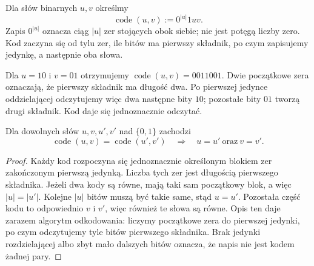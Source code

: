 \begin{definicja}
Dla słów binarnych $u,v$ określmy
\[
\operatorname{code}(u,v):=0^{|u|}1uv.
\]
Zapis $0^{|u|}$ oznacza ciąg $|u|$ zer stojących obok siebie;
nie jest potęgą liczby zero. Kod zaczyna się od tylu zer,
ile bitów ma pierwszy składnik, po czym zapisujemy jedynkę,
a następnie oba słowa.
\end{definicja}

\begin{przyklad}
Dla $u=10$ i $v=01$ otrzymujemy
$\operatorname{code}(u,v)=0011001$.
Dwie początkowe zera oznaczają, że pierwszy składnik
ma długość dwa. Po pierwszej jedynce oddzielającej
odczytujemy więc dwa następne bity $10$; pozostałe bity $01$
tworzą drugi składnik. Kod daje się jednoznacznie odczytać.
\end{przyklad}

\begin{lemat}\label{lem:computability-pair-code}
Dla dowolnych słów $u,v,u',v'$ nad $\{0,1\}$ zachodzi
\[
\operatorname{code}(u,v)=\operatorname{code}(u',v')
\quad\Longrightarrow\quad u=u'\ \text{oraz}\ v=v'.
\]
\end{lemat}
\begin{proof}
Każdy kod rozpoczyna się jednoznacznie określonym
blokiem zer zakończonym pierwszą jedynką.
Liczba tych zer jest długością pierwszego składnika.
Jeżeli dwa kody są równe, mają taki sam początkowy blok,
a więc $|u|=|u'|$. Kolejne $|u|$ bitów muszą być takie same,
stąd $u=u'$. Pozostała część kodu to odpowiednio $v$ i $v'$, 
więc również te słowa są równe. Opis ten daje zarazem algorytm
odkodowania: liczymy początkowe zera do pierwszej jedynki,
po czym odczytujemy tyle bitów pierwszego składnika.
Brak jedynki rozdzielającej albo zbyt mało dalszych bitów
oznacza, że napis nie jest kodem żadnej pary.
\end{proof}

